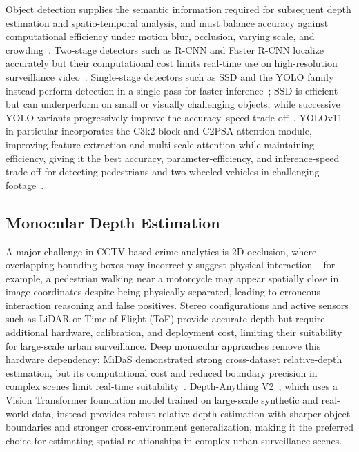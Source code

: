 \documentclass[runningheads]{llncs}
\begin{document}
Object detection supplies the semantic information required for subsequent depth estimation and spatio-temporal analysis, and must balance accuracy against computational efficiency under motion blur, occlusion, varying scale, and crowding~\cite{malhotra2020objectcomparison}. Two-stage detectors such as R-CNN and Faster R-CNN localize accurately but their computational cost limits real-time use on high-resolution surveillance video~\cite{fasterrcnn}. Single-stage detectors such as SSD and the YOLO family instead perform detection in a single pass for faster inference~\cite{ssd,yolo}; SSD is efficient but can underperform on small or visually challenging objects, while successive YOLO variants progressively improve the accuracy--speed trade-off~\cite{yolov8,yolov10,yolov11}. YOLOv11 in particular incorporates the C3k2 block and C2PSA attention module, improving feature extraction and multi-scale attention while maintaining efficiency, giving it the best accuracy, parameter-efficiency, and inference-speed trade-off for detecting pedestrians and two-wheeled vehicles in challenging footage~\cite{yolov11}.


\subsection{Monocular Depth Estimation}

A major challenge in CCTV-based crime analytics is 2D occlusion, where overlapping bounding boxes may incorrectly suggest physical interaction -- for example, a pedestrian walking near a motorcycle may appear spatially close in image coordinates despite being physically separated, leading to erroneous interaction reasoning and false positives. Stereo configurations and active sensors such as LiDAR or Time-of-Flight (ToF) provide accurate depth but require additional hardware, calibration, and deployment cost, limiting their suitability for large-scale urban surveillance. Deep monocular approaches remove this hardware dependency: MiDaS demonstrated strong cross-dataset relative-depth estimation, but its computational cost and reduced boundary precision in complex scenes limit real-time suitability~\cite{monovit}. Depth-Anything V2~\cite{yang2024depth,liuhe2024depthanything}, which uses a Vision Transformer foundation model trained on large-scale synthetic and real-world data, instead provides robust relative-depth estimation with sharper object boundaries and stronger cross-environment generalization, making it the preferred choice for estimating spatial relationships in complex urban surveillance scenes.
\end{document}
